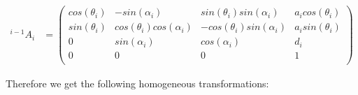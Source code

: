 \begin{align*}
^{i-1}A_i &= 
\begin{pmatrix}
cos(\theta_i) & -sin(\alpha_i) & sin(\theta_i)sin(\alpha_i) & a_icos(\theta_i) \\
sin(\theta_i) & cos(\theta_i)cos(\alpha_i) & -cos(\theta_i)sin(\alpha_i) & a_isin(\theta_i) \\
0 & sin(\alpha_i) & cos(\alpha_i) & d_i \\
0 & 0 & 0 & 1 \\
\end{pmatrix}
\end{align*}

Therefore we get the following homogeneous transformations: